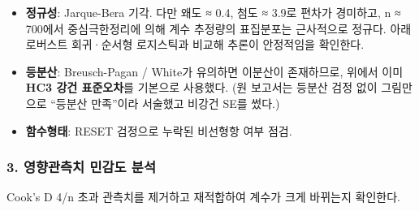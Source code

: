 \documentclass[11pt]{article}
\providecommand{\tightlist}{%
      \setlength{\itemsep}{0pt}\setlength{\parskip}{0pt}}
\begin{document}
    \begin{itemize}
\tightlist
\item
  \textbf{정규성}: Jarque-Bera 기각. 다만 왜도 ≈ 0.4, 첨도 ≈ 3.9로
  편차가 경미하고, n ≈ 700에서 중심극한정리에 의해 계수 추정량의
  표집분포는 근사적으로 정규다. 아래 로버스트 회귀·순서형 로지스틱과
  비교해 추론이 안정적임을 확인한다.
\item
  \textbf{등분산}: Breusch-Pagan / White가 유의하면 이분산이 존재하므로,
  위에서 이미 \textbf{HC3 강건 표준오차}를 기본으로 사용했다. (원
  보고서는 등분산 검정 없이 그림만으로 ``등분산 만족''이라 서술했고
  비강건 SE를 썼다.)
\item
  \textbf{함수형태}: RESET 검정으로 누락된 비선형항 여부 점검.
\end{itemize}

    \hypertarget{uxc601uxd5a5uxad00uxce21uxce58-uxbbfcuxac10uxb3c4-uxbd84uxc11d}{%
\subsubsection{3. 영향관측치 민감도
분석}\label{uxc601uxd5a5uxad00uxce21uxce58-uxbbfcuxac10uxb3c4-uxbd84uxc11d}}

Cook's D 4/n 초과 관측치를 제거하고 재적합하여 계수가 크게 바뀌는지
확인한다.
\end{document}
